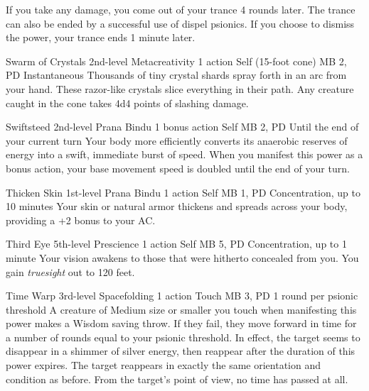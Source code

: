   If you take any damage,
  you come out of your trance 4 rounds later.
  The trance can also be ended by a
  successful use of dispel psionics.
  If you choose to dismiss the power,
  your trance ends 1 minute later.

\DndPowerHeader%
  {Swarm of Crystals}
  {2nd-level Metacreativity}
  {1 action}
  {Self (15-foot cone)}
  {MB 2, PD \lvltwo}
  {Instantaneous}
  Thousands of tiny crystal shards spray forth in an arc from your hand.
  These razor-like crystals slice everything in their path.
  Any creature caught in the cone takes 4d4 points of slashing damage.

\DndPowerHeader%
  {Swiftsteed}
  {2nd-level Prana Bindu}
  {1 bonus action}
  {Self}
  {MB 2, PD \lvltwo}
  {Until the end of your current turn}
  Your body more efficiently converts its anaerobic
  reserves of energy into a swift, immediate burst of speed.
  When you manifest this power as a bonus action,
  your base movement speed is doubled until the end
  of your turn.

\DndPowerHeader%
  {Thicken Skin}
  {1st-level Prana Bindu}
  {1 action}
  {Self}
  {MB 1, PD \lvlone}
  {Concentration, up to 10 minutes}
  Your skin or natural armor thickens
  and spreads across your body,
  providing a +2 bonus to your AC.

\DndPowerHeader%
  {Third Eye}
  {5th-level Prescience}
  {1 action}
  {Self}
  {MB 5, PD \lvlfive}
  {Concentration, up to 1 minute}
Your vision awakens to those that were hitherto
concealed from you.
You gain \emph{truesight} out to 120 feet.

\DndPowerHeader%
  {Time Warp}
  {3rd-level Spacefolding}
  {1 action}
  {Touch}
  {MB 3, PD \lvlthree}
  {1 round per psionic threshold}
  A creature of Medium size or smaller
  you touch when manifesting this power makes a Wisdom saving throw.
  If they fail, they move forward in time for a number of rounds
  equal to your psionic threshold.
  In effect, the target seems to disappear in a shimmer
  of silver energy,
  then reappear after the duration of this power expires.
  The target reappears in exactly the same
  orientation and condition as before.
  From the target's point of view,
  no time has passed at all.

